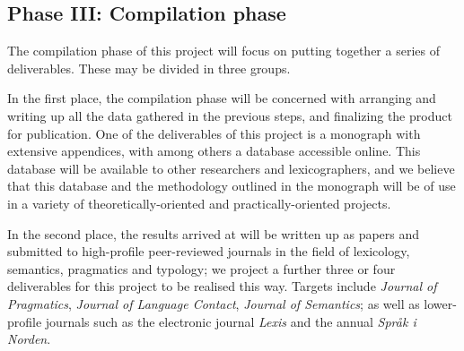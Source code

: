 \documentclass[a4paper]{article}
\begin{document}
	



\subsection{Phase III: Compilation phase}

The compilation phase of this project will focus on putting together a series of deliverables. These may be divided in three groups.

In the first place, the compilation phase will be concerned with arranging and writing up all the data gathered in the previous steps, and finalizing the product for publication. One of the deliverables of this project is a monograph with extensive appendices, with among others a database accessible online. This database will be available to other researchers and lexicographers, and we believe that this database and the methodology outlined in the monograph will be of use in a variety of theoretically-oriented and practically-oriented projects.

In the second place, the results arrived at will be written up as papers and submitted to high-profile peer-reviewed journals in the field of lexicology, semantics, pragmatics and typology; we project a further three or four deliverables for this project to be realised this way. Targets include \emph{Journal of Pragmatics}, \emph{Journal of Language Contact}, \emph{Journal of Semantics}; as well as lower-profile journals such as the electronic journal \emph{Lexis} and the annual \emph{Spr\aa k i Norden}.
\end{document}

